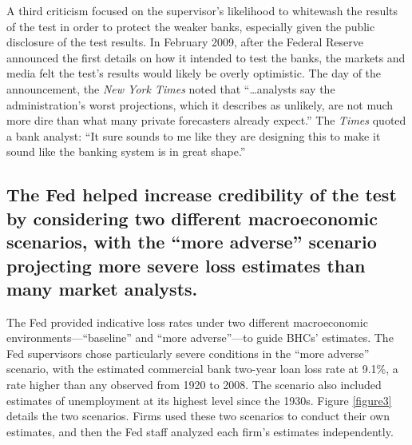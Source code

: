 \documentclass[12pt]{article}
\begin{document}
A third criticism focused on the supervisor's likelihood to whitewash
the results of the test in order to protect the weaker banks, especially given the public disclosure of the test results. In
February 2009, after the Federal Reserve announced the first details on
how it intended to test the banks, the markets and media felt the test's
results would likely be overly optimistic. The day of the announcement,
the \emph{New York Times} noted that ``\ldots{}analysts say
the administration's worst projections, which it describes as unlikely,
are not much more dire than what many private forecasters already
expect.'' The \emph{Times} quoted a bank analyst: ``It sure sounds to me
like they are designing this to make it sound like the banking system is
in great shape.''\citep{NYTimes}

\subsection{The Fed helped increase credibility of the test by
considering two different macroeconomic scenarios, with the ``more adverse''
scenario projecting more severe loss estimates than many market
analysts.}

The Fed provided indicative loss rates under two different macroeconomic
environments---``baseline'' and ``more adverse''---to guide BHCs'
estimates. The Fed supervisors chose particularly severe conditions in
the ``more adverse'' scenario, with the estimated commercial bank
two-year loan loss rate at 9.1\%, a rate higher than any observed from
1920 to 2008. The scenario also included estimates of unemployment at
its highest level since the 1930s. Figure \ref{figure3} details the two scenarios.
Firms used these two scenarios to conduct their own estimates, and then
the Fed staff analyzed each firm's estimates independently.\citep{Results}
\end{document}
